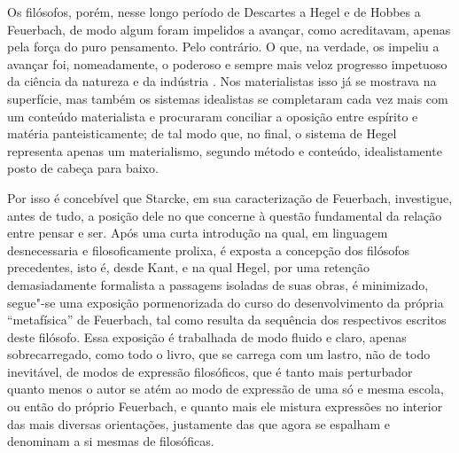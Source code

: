 Os filósofos, porém, nesse longo período
de Descartes a Hegel e de Hobbes a Feuerbach,
de modo algum foram impelidos a avançar, como acreditavam, apenas pela
força do puro pensamento. Pelo contrário. O que, na verdade, os impeliu
a avançar foi, nomeadamente, o poderoso e sempre mais veloz
progresso impetuoso da ciência da natureza \textbar{} e da indústria \textbar{}. Nos materialistas
isso já se mostrava na superfície, mas também os sistemas idealistas se
completaram cada vez mais com um conteúdo materialista e procuraram
conciliar a oposição entre espírito e matéria panteisticamente; de tal
modo que, no final, o sistema de Hegel representa apenas um materialismo, segundo método e conteúdo, idealistamente posto de cabeça para baixo. 

Por isso é concebível que Starcke, em sua caracterização
de Feuerbach,
investigue, antes de tudo, a posição dele no que concerne à questão
fundamental da relação entre pensar e ser. Após uma curta
introdução na qual, em linguagem desnecessaria e filosoficamente
prolixa, é exposta a concepção dos filósofos precedentes, isto é,
desde Kant, %
e na qual
Hegel,
por uma retenção demasiadamente formalista a passagens isoladas de suas
obras, é minimizado, segue"-se uma exposição pormenorizada do curso do
desenvolvimento da própria ``metafísica''
de Feuerbach,
tal como resulta da sequência dos respectivos escritos deste filósofo. %
Essa exposição é trabalhada de modo fluido e claro, apenas
sobrecarregado, como todo o livro, que se carrega com um lastro, não de %
todo inevitável, de modos de expressão filosóficos, que é tanto mais %
perturbador quanto menos o autor se atém ao modo de expressão de uma só
e mesma escola, ou então do
próprio Feuerbach,
e quanto mais ele mistura expressões no interior das mais diversas
orientações, justamente das que agora se espalham e denominam a si
mesmas de filosóficas.

